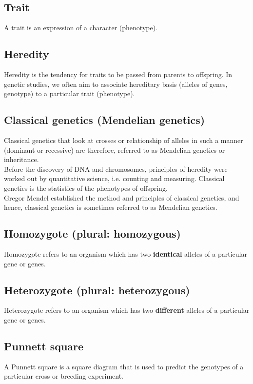 \documentclass[11pt]{article}
\begin{document}
\subsection{Trait}
\label{sec:org2f74e89}
A trait is an expression of a character (phenotype).

\subsection{Heredity}
\label{sec:orgf7835ab}
Heredity is the tendency for traits to be passed from parents to offspring. In genetic studies, we often aim to associate hereditary basis (alleles of genes, genotype) to a particular trait (phenotype).

\subsection{Classical genetics (Mendelian genetics)}
\label{sec:org6b5d50e}
Classical genetics that look at crosses or relationship of alleles in such a manner (dominant or recessive) are therefore, referred to as Mendelian genetics or inheritance.
\\[0pt]

Before the discovery of DNA and chromosomes, principles of heredity were worked out by quantitative science, i.e. counting and measuring. Classical genetics is the statistics of the phenotypes of offspring.
\\[0pt]

Gregor Mendel established the method and principles of classical genetics, and hence, classical genetics is sometimes referred to as Mendelian genetics.

\subsection{Homozygote (plural: homozygous)}
\label{sec:org2fa06d7}
Homozygote refers to an organism which has two \textbf{identical} alleles of a particular gene or genes.

\subsection{Heterozygote (plural: heterozygous)}
\label{sec:orgbe1b16f}
Heterozygote refers to an organism which has two \textbf{different} alleles of a particular gene or genes.

\newpage

\subsection{Punnett square}
\label{sec:org304e1e7}
A Punnett square is a square diagram that is used to predict the genotypes of a particular cross or breeding experiment.
\end{document}

